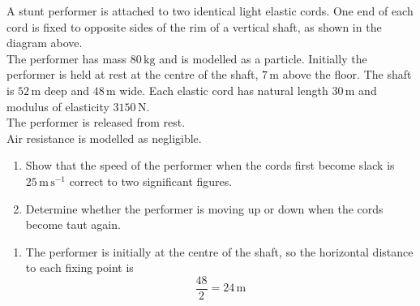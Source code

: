 \documentclass[leqno]{article}
\begin{document}
\begin{enumerate}[
  label=\textbf{\arabic*.},
  leftmargin=*,
  topsep=0pt,
  partopsep=0pt,
  parsep=0pt
]
\begin{figure}[H]
\end{figure}


A stunt performer is attached to two identical light elastic cords. One end of each cord is fixed to opposite sides of the rim of a vertical shaft, as shown in the diagram above. \\

The performer has mass $80\,\mathrm{kg}$ and is modelled as a particle. Initially the performer is held at rest at the centre of the shaft, $7\,\mathrm{m}$ above the floor. The shaft is $52\,\mathrm{m}$ deep and $48\,\mathrm{m}$ wide. Each elastic cord has natural length $30\,\mathrm{m}$ and modulus of elasticity $3150\,\mathrm{N}$. \\

The performer is released from rest. \\

Air resistance is modelled as negligible. \\

\begin{enumerate}[label=\textbf{(\alph*)}]
  \item Show that the speed of the performer when the cords first become slack is $25\,\mathrm{m\,s^{-1}}$ correct to two significant figures.  \\
  \item Determine whether the performer is moving up or down when the cords become taut again.  \\
\end{enumerate}

\vspace*{10pt}

\begin{djsSolution}
\begin{enumerate}[label=\textbf{(\alph*)}, start=1]
  \item The performer is initially at the centre of the shaft, so the horizontal distance to each fixing point is
\[
\frac{48}{2}=24\,\mathrm{m}
\]


\end{enumerate}
\end{djsSolution}
\end{enumerate}
\end{document}
